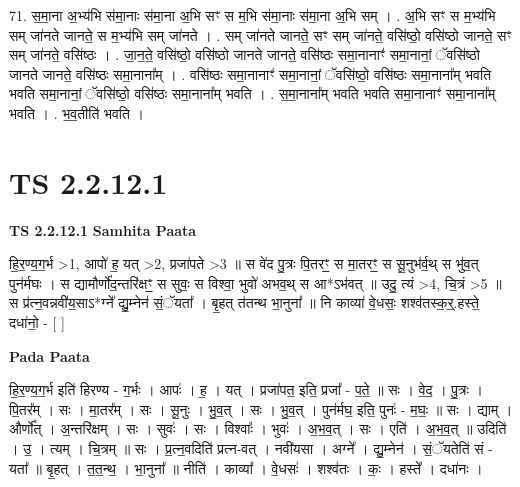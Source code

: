 \documentclass[17pt]{extarticle}
\begin{document}
71. स॒मा॒ना अ॒भ्य॑भि स॑मा॒नाः स॑मा॒ना अ॒भि सꣳ स म॒भि स॑मा॒नाः स॑मा॒ना अ॒भि सम् । . अ॒भि सꣳ स म॒भ्य॑भि सम् जा॑नते जानते॒ स म॒भ्य॑भि सम् जा॑नते । . सम् जा॑नते जानते॒ सꣳ सम् जा॑नते॒ वसि॑ष्ठो॒ वसि॑ष्ठो जानते॒ सꣳ सम् जा॑नते॒ वसि॑ष्ठः । . जा॒न॒ते॒ वसि॑ष्ठो॒ वसि॑ष्ठो जानते जानते॒ वसि॑ष्ठः समा॒नानाꣳ॑ समा॒नानां॒ ॅवसि॑ष्ठो जानते जानते॒ वसि॑ष्ठः समा॒नाना᳚म् । . वसि॑ष्ठः समा॒नानाꣳ॑ समा॒नानां॒ ॅवसि॑ष्ठो॒ वसि॑ष्ठः समा॒नाना᳚म् भवति भवति समा॒नानां॒ ॅवसि॑ष्ठो॒ वसि॑ष्ठः समा॒नाना᳚म् भवति । . स॒मा॒नाना᳚म् भवति भवति समा॒नानाꣳ॑ समा॒नाना᳚म् भवति । . भ॒व॒तीति॑ भवति । \newline
\pagebreak
{}

\section{ TS 2.2.12.1 }

\textbf{TS 2.2.12.1 } \newline
\textbf{Samhita Paata} \newline

हि॒र॒ण्य॒ग॒र्भ >1, आपो॑ ह॒ यत् >2, प्रजा॑पते >3 ॥ स वे॑द पु॒त्रः पि॒तरꣳ॒॒ स मा॒तरꣳ॒॒ स सू॒नुभ॑र्व॒थ् स भु॑व॒त् पुन॑र्मघः । स द्यामौर्णो॑द॒न्तरि॑क्षꣳ॒॒ स सुवः॒ स विश्वा॒ भुवो॑ अभव॒थ् स आ*ऽभ॑वत् ॥ उदु॒ त्यं >4, चि॒त्रं >5 ॥ स प्र॑त्न॒वन्नवी॑य॒साऽ*ग्ने᳚ द्यु॒म्नेन॑ सं॒ॅयता᳚ । बृ॒हत् त॑तन्थ भा॒नुना᳚ ॥ नि काव्या॑ वे॒धसः॒ शश्व॑तस्क॒र्॒.हस्ते॒ दधा॑नो॒ - [  ] \newline

\textbf{Pada Paata} \newline

हि॒र॒ण्य॒ग॒र्भ इति॑ हिरण्य - ग॒र्भः । आपः॑ । ह॒ । यत् । प्रजा॑पत॒ इति॒ प्रजा᳚ - प॒ते॒ ॥ सः । वे॒द॒ । पु॒त्रः । पि॒तर᳚म् । सः । मा॒तर᳚म् । सः । सू॒नुः । भु॒व॒त् । सः । भु॒व॒त् । पुन॑र्मघ॒ इति॒ पुनः॑ - म॒घः॒ ॥ सः । द्याम् । और्णो᳚त् । अ॒न्तरि॑क्षम् । सः । सुवः॑ । सः । विश्वाः᳚ । भुवः॑ । अ॒भ॒व॒त् । सः । एति॑ । अ॒भ॒व॒त् ॥ उदिति॑ । उ॒ । त्यम् । चि॒त्रम् ॥ सः । प्र॒त्न॒वदिति॑ प्रत्न-वत् । नवी॑यसा । अग्ने᳚ । द्यु॒म्नेन॑ । सं॒ॅयतेति॑ सं - यता᳚ ॥ बृ॒हत् । त॒त॒न्थ॒ । भा॒नुना᳚ ॥ नीति॑ । काव्या᳚ । वे॒धसः॑ । शश्व॑तः । कः॒ । हस्ते᳚ । दधा॑नः ।  \newline
\end{document}
